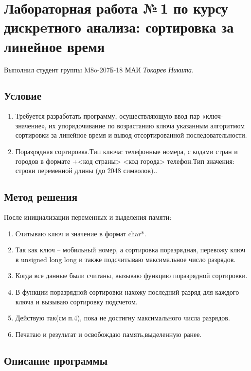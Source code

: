 \documentclass[12pt]{article}
\begin{document}
\section*{Лабораторная работа №\,1 по курсу дискрeтного анализа: сортировка за линейное время}

Выполнил студент группы M8o-207Б-18 МАИ \textit{Токарев Никита}.

\subsection*{Условие}

\begin{enumerate}
\item Требуется разработать программу, осуществляющую ввод пар «ключ-значение», их упорядочивание по возрастанию ключа указанным алгоритмом сортировки за линейное время и вывод отсортированной последовательности.
\item Поразрядная сортировка.Тип ключа: телефонные номера, с кодами стран и городов в формате +<код страны> <код города> телефон.Тип значения: строки переменной длины (до 2048 символов).. 
\end{enumerate}

\subsection*{Метод решения}
После инициализации переменных и выделения памяти:
\begin{enumerate}
\item Считываю ключ и значение в формат char*.
\item Так как ключ -- мобильный номер, а сортировка поразрядная, перевожу ключ в unsigned long long  и также подсчитываю максимальное число разрядов.
\item Когда все данные были считаны, вызываю функцию поразрядной сортировки.
\item В функции поразрядной сортировки нахожу последний разряд для каждого ключа  и вызываю сортировку подсчетом.
\item Действую так(см п.4), пока не достигну максимального числа разрядов.
\item Печатаю и результат и освобождаю память,выделенную ранее.
\end{enumerate}

\subsection*{Описание программы}
\end{document}
